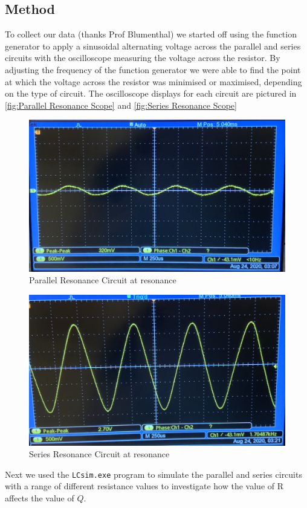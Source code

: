 \documentclass[12pt]{article}
\numberwithin{equation}{section}
\numberwithin{figure}{section}
\begin{document}
    \subsection{Method}
    To collect our data (thanks Prof Blumenthal) we started off using the function generator to apply 
    a sinusoidal alternating voltage across the parallel and series circuits with the oscilloscope 
    measuring the voltage across the resistor. By adjusting the frequency of the function generator 
    we were able to find the point at which the voltage across the resistor was minimised or maximised, 
    depending on the type of circuit. The oscilloscope displays for each circuit are pictured 
    in \autoref{fig:Parallel Resonance Scope} and \autoref{fig:Series Resonance Scope}
    \begin{figure}[h]
        \begin{center}
           \includegraphics[width=.65\textwidth]{Parallel_Resonance_Scope.jpg}
           \caption{Parallel Resonance Circuit at resonance}
           \label{fig:Parallel Resonance Scope}
        \end{center}
    \end{figure}
    \begin{figure}[h]
        \begin{center}
           \includegraphics[width=.65\textwidth]{Series_Resonance_Scope.jpg}
           \caption{Series Resonance Circuit at resonance}
           \label{fig:Series Resonance Scope}
        \end{center}
    \end{figure}
    Next we used the \texttt{LCsim.exe} program to simulate the parallel and series circuits with 
    a range of different resistance values to investigate how the value of R affects the value of $Q$. 
    
    
\end{document}
